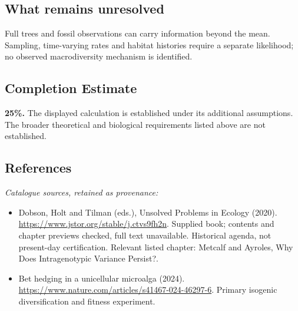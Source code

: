 \documentclass[11pt]{article}
\begin{document}
\subsection{What remains unresolved}
Full trees and fossil observations can carry information beyond the mean. Sampling, time-varying rates and habitat histories require a separate likelihood; no observed macrodiversity mechanism is identified.
\subsection{Completion Estimate}
\textbf{25\%.} The displayed calculation is established under its additional assumptions. The broader theoretical and biological requirements listed above are not established.
\subsection{References}
\noindent\emph{Catalogue sources, retained as provenance:}
\begin{itemize}
\item Dobson, Holt and Tilman (eds.), Unsolved Problems in Ecology (2020). \url{https://www.jstor.org/stable/j.ctvs9fh2n}. Supplied book; contents and chapter previews checked, full text unavailable. Historical agenda, not present-day certification. Relevant listed chapter: Metcalf and Ayroles, Why Does Intragenotypic Variance Persist?.
\item Bet hedging in a unicellular microalga (2024). \url{https://www.nature.com/articles/s41467-024-46297-6}. Primary isogenic diversification and fitness experiment.
\end{itemize}
\end{document}
